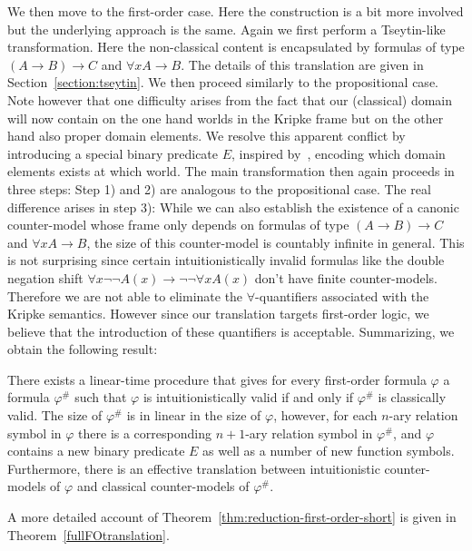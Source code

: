 \documentclass[runningheads]{llncs}
\begin{document}
We then move to the first-order case. Here the construction is a bit more involved but the underlying approach is the same.
Again we first perform a Tseytin-like transformation.
Here the non-classical content is encapsulated by formulas of type $(A\to B)\to C$ and $\forall xA\to B$.
The details of this translation are given in Section~\ref{section:tseytin}.
We then proceed similarly to the propositional case.
Note however that one difficulty arises from the fact that our (classical) domain will now contain on the one hand worlds in the Kripke frame but on the other hand also proper domain elements.
We resolve this apparent conflict by introducing a special binary predicate $E$, inspired by~\cite{iemhoff2010eskolemization}, encoding which domain elements exists at which world.
The main transformation then again proceeds in three steps:
Step 1) and 2) are analogous to the propositional case.
The real difference arises in step 3):
While we can also establish the existence of a canonic counter-model whose frame only depends on formulas of type $(A\to B)\to C$ and $\forall xA\to B$, the size of this counter-model is countably infinite in general.
This is not surprising since certain intuitionistically invalid formulas like the double negation shift $\forall x\neg\neg A(x)\to \neg\neg\forall x A(x)$ don't have finite counter-models.
Therefore we are not able to eliminate the $\forall$-quantifiers associated with the Kripke semantics.
However since our translation targets first-order logic, we believe that the introduction of these quantifiers is acceptable.
%
Summarizing, we obtain the following result:

\begin{theorem}
\label{thm:reduction-first-order-short}
There exists a linear-time procedure that gives for every first-order formula $\varphi$ a formula $\varphi^\#$ such that $\varphi$ is intuitionistically valid if and only if $\varphi^\#$ is classically valid. The size of $\varphi^\#$ is in linear in the size of $\varphi$, however, for each $n$-ary relation symbol in $\varphi$ there is a corresponding $n+1$-ary relation symbol in $\varphi^\#$, and $\varphi$ contains a new binary predicate $E$ as well as a number of new function symbols. Furthermore, there is an effective translation between intuitionistic counter-models of $\varphi$ and classical counter-models of $\varphi^\#$.
\end{theorem}
A more detailed account of Theorem~\ref{thm:reduction-first-order-short} is given in Theorem~\ref{fullFOtranslation}.
\end{document}
